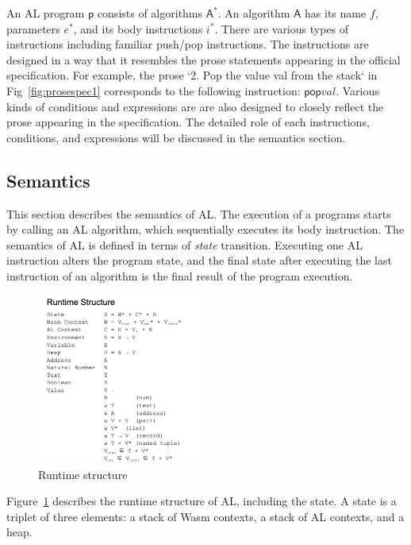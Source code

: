 An AL program $\mathsf{p}$ consists of algorithms $\mathsf{A}^\ast$.  An
algorithm $\mathsf{A}$ has its name $\mathit{f}$, parameters
${\mathit{e}^\ast}$, and its body instructions ${\mathit{i}^\ast}$.  There are
various types of instructions including familiar push/pop instructions. The
instructions are designed in a way that it resembles the prose statements
appearing in the official specification.  For example, the prose `2. Pop the
value val from the stack` in Fig~\ref{fig:prosespec1} corresponds to the following
instruction: $\mathsf{pop} \mathit{val}$. Various kinds of conditions and expressions are
are also designed to closely reflect the prose appearing in the specification.
The detailed role of each instructions, conditions, and expressions will be discussed
in the semantics section.

\subsection{Semantics}

This section describes the semantics of AL.
The execution of a programs starts by calling an AL algorithm,
which sequentially executes its body instruction.
The semantics of AL is defined in terms of \textit{state} transition.
Executing one AL instruction alters the program state,
and the final state after executing the last instruction of an algorithm is the
final result of the program execution. 

\begin{figure}
  \centering
  \includegraphics[width=0.5\textwidth]{../img/runtime.png}
  \caption{Runtime structure}
  \label{fig:runtime}
\end{figure}

Figure~\ref{fig:runtime} describes the runtime structure of AL, including the state.
A state is a triplet of three elements: a stack of Wasm contexts, a stack of AL contexts, and a heap.

